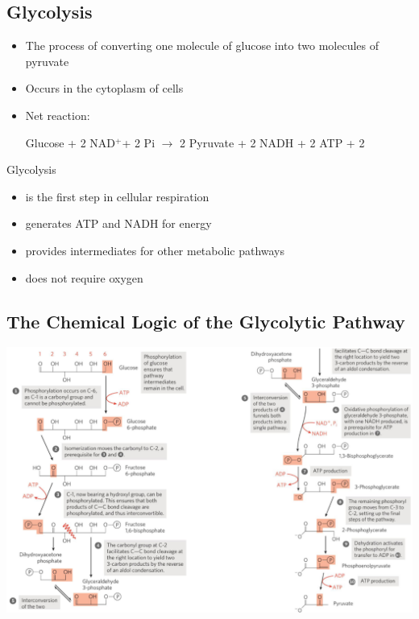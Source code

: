 \documentclass[10pt]{article}
\newcommand{\water}{\text{H$_2$O}}
\newcommand{\pc}{$^+$}
\begin{document}
\subsection*{Glycolysis}
\begin{itemize}
	\item The process of converting one molecule of glucose into two molecules of pyruvate
	\item Occurs in the cytoplasm of cells
	\item Net reaction:
	\begin{center} 
        Glucose + 2 NAD\pc + 2 Pi $\rightarrow$ 2 Pyruvate + 2 NADH + 2 ATP + 2 \water
    \end{center}
\end{itemize}
Glycolysis
\begin{itemize}
	\item is the first step in cellular respiration
	\item generates ATP and NADH for energy
	\item provides intermediates for other metabolic pathways
	\item does not require oxygen
\end{itemize}

\subsection*{The Chemical Logic of the Glycolytic Pathway}
\begin{center} 
	\includegraphics*[width=\textwidth]{L3_1.png}
\end{center}

\pagebreak
\end{document}
